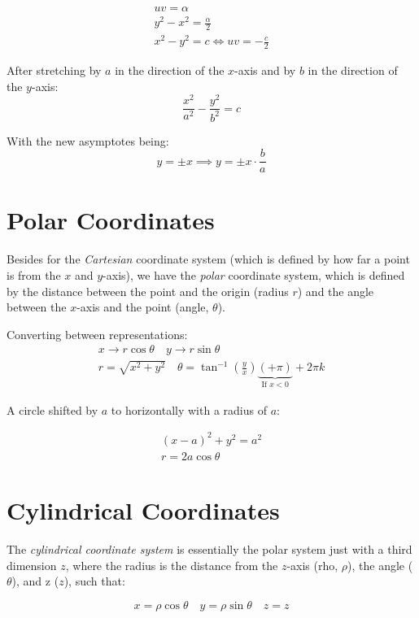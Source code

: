\documentclass[00_complete]{subfiles}
\begin{document}
\begin{conclusion}
$$
\begin{gathered}
    uv = \alpha \\
    y^2 - x^2 = \frac{\alpha}{2} \\
    x^2 - y^2 = c \iff uv = -\frac{c}{2}
\end{gathered}
$$
\end{conclusion}

After stretching by $a$ in the direction of the $x$-axis and by $b$ in the
direction of the $y$-axis:
$$\frac{x^2}{a^2} - \frac{y^2}{b^2} = c$$

With the new asymptotes being:
$$y=\pm x \implies y=\pm x \cdot \frac{b}{a}$$

\section{Polar Coordinates}

Besides for the \emph{Cartesian} coordinate system (which is defined by how far a
point is from the $x$ and $y$-axis), we have the \emph{polar} coordinate system,
which is defined by the distance between the point and the origin (radius $r$) and
the angle between the $x$-axis and the point (angle, $\theta$).

Converting between representations:
$$
\begin{gathered}
  x \to r \cos \theta \quad y \to r \sin \theta \\
  r = \sqrt{x^2+y^2} \quad \theta = \tan^{-1}\left(\frac{y}{x}\right)\underbrace{(+ \pi)}_{\text{If $x<0$}} +2 \pi k
\end{gathered}
$$

A circle shifted by $a$ to horizontally with a radius of $a$:

$$
\begin{gathered}
    (x-a)^2+y^2=a^2 \\
    r = 2a \cos \theta
\end{gathered}
$$

\section{Cylindrical Coordinates}

The \emph{cylindrical coordinate system} is essentially the polar system just with a
third dimension $z$, where the radius is the distance from the $z$-axis (rho,
$\rho$), the angle ($\theta$), and z ($z$), such that:

$$x = \rho \cos \theta \quad y = \rho \sin \theta \quad z = z$$
\end{document}
